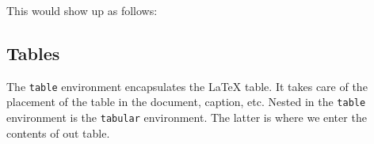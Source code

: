 \documentclass{article}
\theoremstyle{remark}
\begin{document}
    This would show up as follows: 
    \begin{figure}[H]
        \centering
        \begin{floatrow}
        \end{floatrow}    
        \begin{floatrow}
        \end{floatrow}
    \end{figure}

    \subsection{Tables}
    The \verb!table! environment encapsulates the \LaTeX{} table. It takes care 
    of the placement of the table in the document, caption, etc. Nested in the \verb!table!
    environment is the \verb!tabular! environment. The latter is where we enter the contents of out table.
\end{document}
